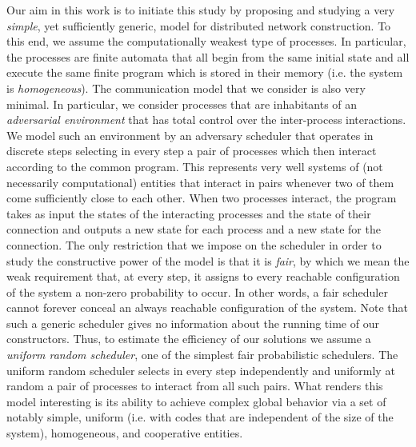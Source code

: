 \documentclass[oribibl, 11pt]{llncs}
\begin{document}
Our aim in this work is to initiate this study by proposing and studying a very \emph{simple}, yet sufficiently generic, model for distributed network construction. To this end, we assume the computationally weakest type of processes. In particular, the processes are finite automata that all begin from the same initial state and all execute the same finite program which is stored in their memory (i.e. the system is \emph{homogeneous}). The communication model that we consider is also very minimal. In particular, we consider processes that are inhabitants of an \emph{adversarial environment} that has total control over the inter-process interactions. We model such an environment by an adversary scheduler that operates in discrete steps selecting in every step a pair of processes which then interact according to the common program. This represents very well systems of (not necessarily computational) entities that interact in pairs whenever two of them come sufficiently close to each other. When two processes interact, the program takes as input the states of the interacting processes and the state of their connection and outputs a new state for each process and a new state for the connection. The only restriction that we impose on the scheduler in order to study the constructive power of the model is that it is \emph{fair}, by which we mean the weak requirement that, at every step, it assigns to every reachable configuration of the system a non-zero probability to occur. In other words, a fair scheduler cannot forever conceal an always reachable configuration of the system. Note that such a generic scheduler gives no information about the running time of our constructors. Thus, to estimate the efficiency of our solutions we assume a \emph{uniform random scheduler}, one of the simplest fair probabilistic schedulers. The uniform random scheduler selects in every step independently and uniformly at random a pair of processes to interact from all such pairs. What renders this model interesting is its ability to achieve complex global behavior via a set of notably simple, uniform (i.e. with codes that are independent of the size of the system), homogeneous, and cooperative entities.
\end{document}

